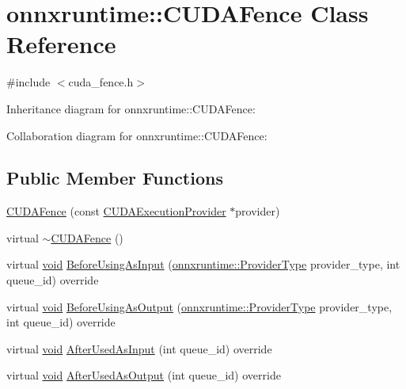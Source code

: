 \hypertarget{classonnxruntime_1_1CUDAFence}{}\section{onnxruntime\+:\+:C\+U\+D\+A\+Fence Class Reference}
\label{classonnxruntime_1_1CUDAFence}


{\ttfamily \#include $<$cuda\+\_\+fence.\+h$>$}



Inheritance diagram for onnxruntime\+:\+:C\+U\+D\+A\+Fence\+:


Collaboration diagram for onnxruntime\+:\+:C\+U\+D\+A\+Fence\+:
\subsection*{Public Member Functions}
\begin{DoxyCompactItemize}
\item 
\mbox{\hyperlink{classonnxruntime_1_1CUDAFence_ad081758839cc66780efcfd961ddde24c}{C\+U\+D\+A\+Fence}} (const \mbox{\hyperlink{classonnxruntime_1_1CUDAExecutionProvider}{C\+U\+D\+A\+Execution\+Provider}} $\ast$provider)
\item 
virtual \mbox{\hyperlink{classonnxruntime_1_1CUDAFence_a6aca5ff368dfce2619a66b5f216933b9}{$\sim$\+C\+U\+D\+A\+Fence}} ()
\item 
virtual \mbox{\hyperlink{mlasi_8h_a88f941d423cb2a819b70a1358982b1a6}{void}} \mbox{\hyperlink{classonnxruntime_1_1CUDAFence_ae696393f88e06ad9e8c8576f6f306c32}{Before\+Using\+As\+Input}} (\mbox{\hyperlink{namespaceonnxruntime_a863e2227cbf32aab76aad35fdadff4bb}{onnxruntime\+::\+Provider\+Type}} provider\+\_\+type, int queue\+\_\+id) override
\item 
virtual \mbox{\hyperlink{mlasi_8h_a88f941d423cb2a819b70a1358982b1a6}{void}} \mbox{\hyperlink{classonnxruntime_1_1CUDAFence_a93950e06048ab9d52523beaa5b89d481}{Before\+Using\+As\+Output}} (\mbox{\hyperlink{namespaceonnxruntime_a863e2227cbf32aab76aad35fdadff4bb}{onnxruntime\+::\+Provider\+Type}} provider\+\_\+type, int queue\+\_\+id) override
\item 
virtual \mbox{\hyperlink{mlasi_8h_a88f941d423cb2a819b70a1358982b1a6}{void}} \mbox{\hyperlink{classonnxruntime_1_1CUDAFence_a21849fcb69441a710decac8f8c7c4145}{After\+Used\+As\+Input}} (int queue\+\_\+id) override
\item 
virtual \mbox{\hyperlink{mlasi_8h_a88f941d423cb2a819b70a1358982b1a6}{void}} \mbox{\hyperlink{classonnxruntime_1_1CUDAFence_aa28331c001ce365edb1aca7e8c801c3f}{After\+Used\+As\+Output}} (int queue\+\_\+id) override
\end{DoxyCompactItemize}


